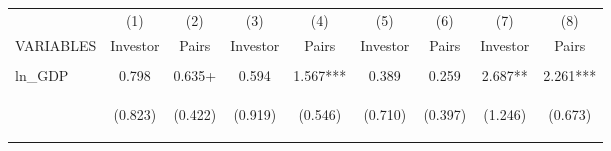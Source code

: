 \begin{center}
\begin{tabular}{lcccccccc} \hline
 & (1) & (2) & (3) & (4) & (5) & (6) & (7) & (8) \\
VARIABLES & Investor & Pairs & Investor & Pairs & Investor & Pairs & Investor & Pairs \\ \hline
\vspace{4pt} & \begin{footnotesize}\end{footnotesize} & \begin{footnotesize}\end{footnotesize} & \begin{footnotesize}\end{footnotesize} & \begin{footnotesize}\end{footnotesize} & \begin{footnotesize}\end{footnotesize} & \begin{footnotesize}\end{footnotesize} & \begin{footnotesize}\end{footnotesize} & \begin{footnotesize}\end{footnotesize} \\
ln\_GDP & 0.798 & 0.635+ & 0.594 & 1.567*** & 0.389 & 0.259 & 2.687** & 2.261*** \\
\vspace{4pt} & \begin{footnotesize}(0.823)\end{footnotesize} & \begin{footnotesize}(0.422)\end{footnotesize} & \begin{footnotesize}(0.919)\end{footnotesize} & \begin{footnotesize}(0.546)\end{footnotesize} & \begin{footnotesize}(0.710)\end{footnotesize} & \begin{footnotesize}(0.397)\end{footnotesize} & \begin{footnotesize}(1.246)\end{footnotesize} & \begin{footnotesize}(0.673)\end{footnotesize} \\

\end{tabular}
\end{center}
